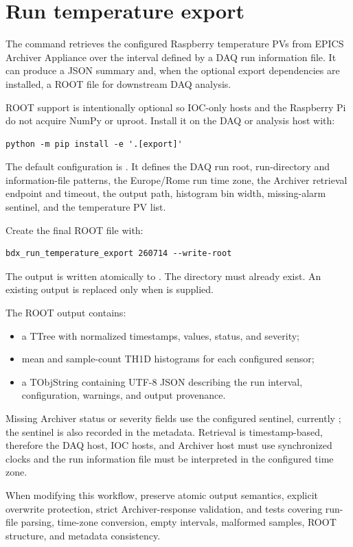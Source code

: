 \section{Run temperature export}

The command  retrieves the configured Raspberry temperature PVs from EPICS Archiver Appliance over the interval defined by a DAQ run information file. It can produce a JSON summary and, when the optional export dependencies are installed, a ROOT file for downstream DAQ analysis.

ROOT support is intentionally optional so IOC-only hosts and the Raspberry Pi do not acquire NumPy or uproot. Install it on the DAQ or analysis host with:

\begin{lstlisting}[style=shell]
python -m pip install -e '.[export]'
\end{lstlisting}

The default configuration is . It defines the DAQ run root, run-directory and information-file patterns, the Europe/Rome run time zone, the Archiver retrieval endpoint and timeout, the output path, histogram bin width, missing-alarm sentinel, and the temperature PV list.

Create the final ROOT file with:

\begin{lstlisting}[style=shell]
bdx_run_temperature_export 260714 --write-root
\end{lstlisting}

The output is written atomically to . The  directory must already exist. An existing output is replaced only when  is supplied.

The ROOT output contains:

\begin{itemize}
  \item a  TTree with normalized timestamps, values, status, and severity;
  \item mean and sample-count TH1D histograms for each configured sensor;
  \item a  TObjString containing UTF-8 JSON describing the run interval, configuration, warnings, and output provenance.
\end{itemize}

Missing Archiver status or severity fields use the configured  sentinel, currently ; the sentinel is also recorded in the metadata. Retrieval is timestamp-based, therefore the DAQ host, IOC hosts, and Archiver host must use synchronized clocks and the run information file must be interpreted in the configured time zone.

When modifying this workflow, preserve atomic output semantics, explicit overwrite protection, strict Archiver-response validation, and tests covering run-file parsing, time-zone conversion, empty intervals, malformed samples, ROOT structure, and metadata consistency.
